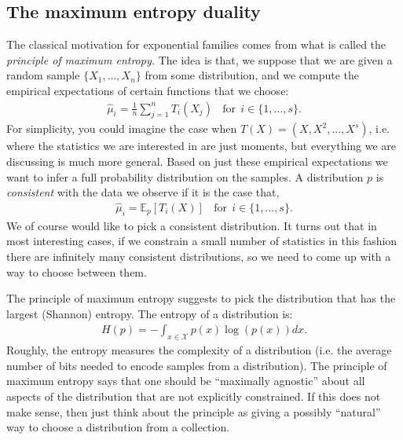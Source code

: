 \documentclass[twoside,12pt]{article}
\begin{document}
\subsection{The maximum entropy duality}
The classical motivation for exponential families comes from what is called the \emph{principle of maximum entropy. } The idea is that, we suppose that we are given a random sample $\{X_1,\ldots,X_n\}$ from some distribution, and we compute the empirical expectations of certain functions that we choose: 
\begin{align*}
\widehat{\mu}_i = \frac{1}{n} \sum_{j=1}^n T_i(X_j)~~~~\text{for}~~i \in \{1,\ldots,s\}.
\end{align*}
For simplicity, you could imagine the case when $T(X) = (X,X^2,\ldots,X^s)$, i.e. where the statistics we are interested in are just moments, but everything we are discussing is much more general. 
Based on just these empirical expectations we want to infer a full probability distribution on the samples. 
A distribution $p$ is \emph{consistent} with the data we observe if it is the case that,
\begin{align*}
\widehat{\mu}_i = \mathbb{E}_{p} [T_i(X)]~~~~\text{for}~~i \in \{1,\ldots,s\}.
\end{align*}
We of course would like to pick a consistent distribution. It turns out that in most interesting cases, if we constrain a small number of statistics in this fashion there are infinitely many consistent distributions, so we need to come up with a way to choose between them. 

The principle of maximum entropy suggests to pick the distribution that has the largest (Shannon) entropy. The entropy of a distribution is:
\begin{align*}
H(p) = - \int_{x \in \mathcal{X}} p(x) \log (p(x)) dx. 
\end{align*}
Roughly, the entropy measures the complexity of a distribution (i.e. the average number of bits needed to encode samples from a distribution). The principle of maximum entropy says that one should be ``maximally agnostic'' about all aspects of the distribution that are not explicitly constrained. If this does not make sense, then just think about the principle as giving a possibly ``natural'' way to choose a distribution from a collection. 
\end{document}
